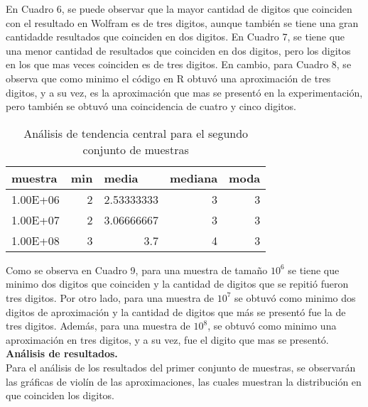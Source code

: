 \documentclass{report}
\begin{document}
\noindent En Cuadro 6, se puede observar que la mayor cantidad de digitos que coinciden con el resultado en Wolfram es de tres digitos, aunque también se tiene una gran cantidadde resultados que coinciden en dos digitos. En  Cuadro 7, se tiene que una menor cantidad de resultados que coinciden en dos digitos, pero los digitos en los que mas veces coinciden es de tres digitos. En cambio, para Cuadro 8, se observa que como minimo el código en R obtuvó una aproximación de tres digitos, y a su vez, es la aproximación que mas se presentó en la experimentación, pero también se obtuvó una coincidencia de cuatro y cinco digitos. \\

\begin{table}[h]
  \centering
    \begin{tabular}{rrrrr} \hline
    \multicolumn{1}{l}{muestra} & \multicolumn{1}{l}{min} & \multicolumn{1}{l}{media} & \multicolumn{1}{l}{mediana} & \multicolumn{1}{l}{moda} \\ \hline
    1.00E+06 & 2     & 2.53333333 & 3     & 3 \\ \hline
    1.00E+07 & 2     & 3.06666667 & 3     & 3 \\ \hline
    1.00E+08 & 3     & 3.7   & 4     & 3 \\ \hline
    \end{tabular}
    \caption{Análisis de tendencia central para el segundo conjunto de muestras}
    \label{Análisis de tendencia central para el segundo conjunto de muestras}
\end{table}

\noindent Como se observa en Cuadro 9, para una muestra de tamaño $10^{6}$ se tiene que minimo dos digitos que coinciden y la cantidad de digitos que se repitió fueron tres digitos. Por otro lado, para una muestra de $10^{7}$ se obtuvó como minimo dos digitos de aproximación y la cantidad de digitos que más se presentó fue la de tres digitos. Además, para una muestra de $10^{8}$, se obtuvó como minimo una aproximación en tres digitos, y a su vez, fue el digito que mas se presentó. \\


\noindent \Large \textbf{Análisis de resultados.} \\

\noindent Para el análisis de los resultados del primer conjunto de muestras, se observarán las gráficas de violín de las aproximaciones, las cuales muestran la distribución en que coinciden los digitos. \\
\end{document}
